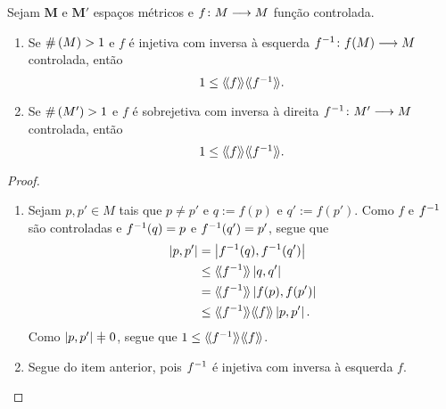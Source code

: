 \begin{proposition}
Sejam $\bm M$ e $\bm M'$ espaços métricos e $f\colon \allowbreak M \longrightarrow M$ função controlada.
	\begin{enumerate}
		\item Se $\#\left({M}\right) > 1$ e $f$ é injetiva com inversa à esquerda $f^{-1}\colon \allowbreak f(M) \longrightarrow M$ controlada, então
			\begin{equation*}
\textstyle	1 \leq \langle\!\langle{f}\rangle\!\rangle\langle\!\langle{f^{-1}}\rangle\!\rangle.
			\end{equation*}
		\item Se $\#\left({M'}\right) > 1$ e $f$ é sobrejetiva com inversa à direita $f^{-1}\colon \allowbreak M' \longrightarrow M$ controlada, então
			\begin{equation*}
\textstyle	1 \leq \langle\!\langle{f}\rangle\!\rangle\langle\!\langle{f^{-1}}\rangle\!\rangle.
			\end{equation*}
	\end{enumerate}
\end{proposition}
\begin{proof}
	\begin{enumerate}
	\item Sejam $p,p' \in M$ tais que $p \neq p'$ e $q := f(p)$ e $q' := f(p')$. Como $f$ e $f^{-1}$ são controladas e $f^{-1}(q) = p$ e $f^{-1}(q')=p'$, segue que
		\begin{align*}
		\dist{p}{p'} &= \dist{f\inv(q)}{f\inv(q')} \\
			&\leq \distor{f\inv}\dist{q}{q'} \\
			&= \distor{f\inv}\dist{f(p)}{f(p')} \\
			&\leq \distor{f\inv}\distor{f}\dist{p}{p'}.
		\end{align*}
	Como $\dist{p}{p'} \neq 0$, segue que $1 \leq \langle\!\langle{f^{-1}}\rangle\!\rangle\langle\!\langle{f}\rangle\!\rangle$.

	\item Segue do item anterior, pois $f^{-1}$ é injetiva com inversa à esquerda $f$.
	\qedhere
	\end{enumerate}
\end{proof}

